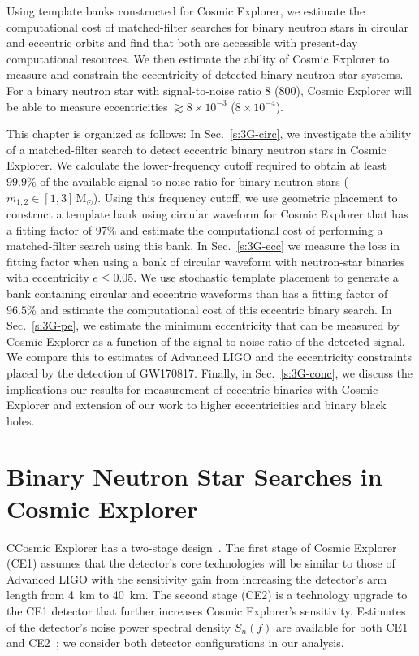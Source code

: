 Using template banks constructed for Cosmic Explorer, we estimate the computational cost of matched-filter searches for binary neutron stars in circular and eccentric orbits and find that both are accessible with present-day computational resources. We then estimate the ability of Cosmic Explorer to measure and constrain the eccentricity of detected binary neutron star systems. For a binary neutron star with signal-to-noise ratio 8 (800), Cosmic Explorer will be able to measure eccentricities $\gtrsim 8\times 10^{-3}$ ($8\times 10^{-4}$). 

This chapter is organized as follows: In Sec.~\ref{s:3G-circ}, we investigate the ability of a matched-filter search to detect eccentric binary neutron stars in Cosmic Explorer. We calculate the lower-frequency cutoff required to obtain at least $99.9\%$ of the available signal-to-noise ratio for binary neutron stars ($m_{1,2} \in [1,3]\,\mathrm{M}_\odot$). Using this frequency cutoff, we use geometric placement to construct a template bank using circular waveform for Cosmic Explorer that has a fitting factor of $97\%$ and estimate the computational cost of performing a matched-filter search using this bank. In Sec.~\ref{s:3G-ecc} we measure the loss in fitting factor when using a bank of circular waveform with neutron-star binaries with eccentricity $e \le 0.05$. We use stochastic template placement to generate a bank containing circular and eccentric waveforms than has a fitting factor of $96.5\%$ and estimate the computational cost of this eccentric binary search. In Sec.~\ref{s:3G-pe}, we estimate the minimum eccentricity that can be measured by Cosmic Explorer as a function of the signal-to-noise ratio of the detected signal. We compare this to estimates of Advanced LIGO and the eccentricity constraints placed by the detection of GW170817. Finally, in Sec.~\ref{s:3G-conc}, we discuss the implications our results for measurement of eccentric binaries with Cosmic Explorer and extension of our work to higher eccentricities and binary black holes.


\section{\label{s:3G-circ} Binary Neutron Star Searches in Cosmic Explorer}

CCosmic Explorer has a two-stage design~\cite{Reitze:2019dyk, Reitze:2019iox}. The first stage of Cosmic Explorer (CE1) assumes that the detector's core technologies will be similar to those of Advanced LIGO with the sensitivity gain from increasing the detector's arm length from 4~km to 40~km. The second stage (CE2) is a technology upgrade to the CE1 detector that further increases Cosmic Explorer's sensitivity. Estimates of the detector's noise power spectral density $S_n(f)$ are available for both CE1 and CE2~\cite{CE:NoiseCurves}; we consider both detector configurations in our analysis. 

